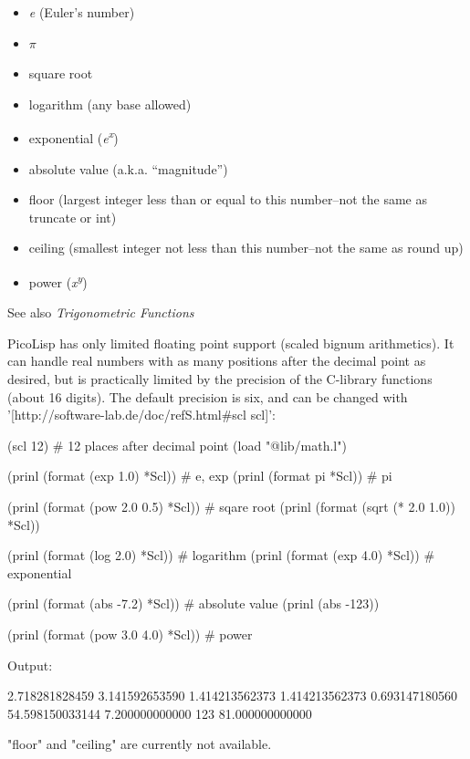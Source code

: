 \begin{itemize}
\item
  \emph{e} (Euler's number)
\item
  $\pi$
\item
  square root
\item
  logarithm (any base allowed)
\item
  exponential (\emph{e}\textsuperscript{\emph{x}})
\item
  absolute value (a.k.a. ``magnitude'')
\item
  floor (largest integer less than or equal to this number--not the same
  as truncate or int)
\item
  ceiling (smallest integer not less than this number--not the same as
  round up)
\item
  power (\emph{x}\textsuperscript{\emph{y}})
\end{itemize}

See also \emph{Trigonometric Functions}


\begin{wideverbatim}

PicoLisp has only limited floating point support (scaled bignum arithmetics). It
can handle real numbers with as many positions after the decimal point as
desired, but is practically limited by the precision of the C-library functions
(about 16 digits). The default precision is six, and can be changed with
'[http://software-lab.de/doc/refS.html#scl scl]':

(scl 12)  # 12 places after decimal point
(load "@lib/math.l")

(prinl (format (exp 1.0) *Scl))        # e, exp
(prinl (format pi *Scl))               # pi

(prinl (format (pow 2.0 0.5) *Scl))    # sqare root
(prinl (format (sqrt (* 2.0 1.0)) *Scl))

(prinl (format (log 2.0) *Scl))        # logarithm
(prinl (format (exp 4.0) *Scl))        # exponential

(prinl (format (abs -7.2) *Scl))       # absolute value
(prinl (abs -123))

(prinl (format (pow 3.0 4.0) *Scl))    # power

Output:

2.718281828459
3.141592653590
1.414213562373
1.414213562373
0.693147180560
54.598150033144
7.200000000000
123
81.000000000000

"floor" and "ceiling" are currently not available.

\end{wideverbatim}

